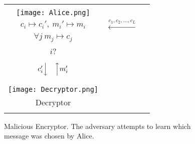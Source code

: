 \documentclass[10pt,journal]{IEEEtran}
\begin{document}
\begin{figure}[!t]
\centering
\begin{tabular}{ccc}
\ovalbox{\begin{minipage}{0.3\columnwidth}
\centering
Alice\\
\vspace{0.1cm}
\texttt{[image: Alice.png]}\\
$c_i \mapsto c_i', ~ m_i' \mapsto m_i$
\end{minipage}
}
& $\overset{c_1,c_2,\ldots,c_L}{\longleftarrow}$ & 
\color{red}
\Ovalbox{\begin{minipage}{0.3\columnwidth}
\centering
Adversary\\
$\forall j~m_j \mapsto c_j$\\
$i$?
\end{minipage}
}\\
 & & \\
$c_i' \Big\downarrow \quad \Big\uparrow m_i'$ & & \\
 & & \\
\ovalbox{\begin{minipage}{0.25\columnwidth}
\centering
$c_i' \mapsto m_i'$\\
\vspace{0.1cm}
\texttt{[image: Decryptor.png]}\\
\vspace{-0.1cm}
Decryptor\\
\end{minipage}
}
\end{tabular}
\caption{Malicious Encryptor. The adversary attempts to learn which message was chosen by Alice.}
\label{fig:malicious_Bob}
\end{figure}
\end{document}
